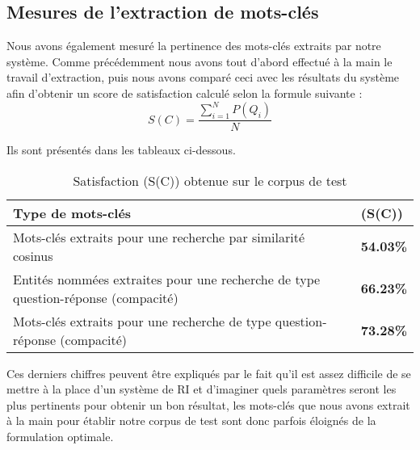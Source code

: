 \documentclass[10pt,a4paper]{article}
\begin{document}
\subsection{Mesures de l'extraction de mots-clés}

\par Nous avons également mesuré la pertinence des mots-clés extraits par notre système. Comme précédemment nous avons tout d'abord effectué \og{}à la main\fg{} le travail d'extraction, puis nous avons comparé ceci avec les résultats du système afin d'obtenir un score de satisfaction calculé selon la formule suivante : $$S(C) = \frac{\sum_{i = 1}^{N} P(Q_i)}{N}$$
\par Ils sont présentés dans les tableaux ci-dessous.

\begin{table}[htbp]
    \begin{center}
        \begin{tabular}{|p{12cm}|l|}
            \hline
            Type de mots-clés & (S(C)) \\
            \hline
            Mots-clés extraits pour une recherche par similarité cosinus & \textbf{54.03\%} \\
            \hline
            Entités nommées extraites pour une recherche de type question-réponse (compacité) & \textbf{66.23\%} \\
            \hline
            Mots-clés extraits pour une recherche de type question-réponse (compacité) & \textbf{73.28\%} \\
            \hline
        \end{tabular}
        \caption{\label{tab:results}Satisfaction (S(C)) obtenue sur le corpus de test}
    \end{center}
\end{table}

\par Ces derniers chiffres peuvent être expliqués par le fait qu'il est assez difficile de se mettre à la place d'un système de RI et d'imaginer quels paramètres seront les plus pertinents pour obtenir un bon résultat, les mots-clés que nous avons extrait \og{}à la main\fg{} pour établir notre corpus de test sont donc parfois éloignés de la formulation optimale.
\end{document}
